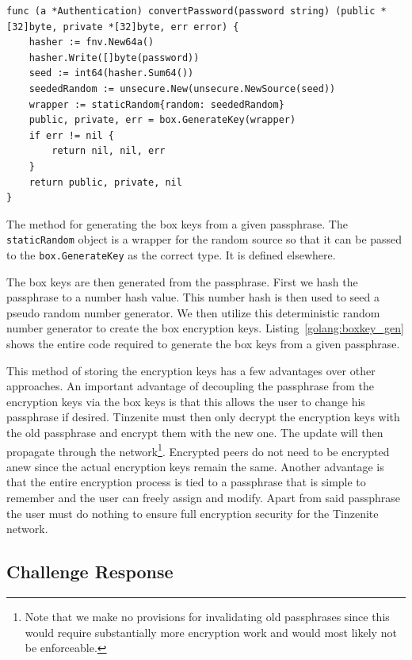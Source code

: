 \begin{listing}[htp]
    \begin{lstlisting}[language=golang,firstnumber=0]
func (a *Authentication) convertPassword(password string) (public *[32]byte, private *[32]byte, err error) {
	hasher := fnv.New64a()
	hasher.Write([]byte(password))
	seed := int64(hasher.Sum64())
	seededRandom := unsecure.New(unsecure.NewSource(seed))
	wrapper := staticRandom{random: seededRandom}
	public, private, err = box.GenerateKey(wrapper)
	if err != nil {
		return nil, nil, err
	}
	return public, private, nil
}
    \end{lstlisting}
\caption[Golang Box Key Generation]{The method for generating the box keys from a given passphrase. The \texttt{staticRandom} object is a wrapper for the random source so that it can be passed to the \texttt{box.GenerateKey} as the correct type. It is defined elsewhere.}
\label{golang:boxkey_gen}
\end{listing}

The box keys are then generated from the passphrase.
First we hash the passphrase to a number hash value.
This number hash is then used to seed a pseudo random number generator.
We then utilize this deterministic random number generator to create the box encryption keys.
Listing~\ref{golang:boxkey_gen} shows the entire code required to generate the box keys from a given passphrase.

This method of storing the encryption keys has a few advantages over other approaches.
An important advantage of decoupling the passphrase from the encryption keys via the box keys is that this allows the user to change his passphrase if desired.
Tinzenite must then only decrypt the encryption keys with the old passphrase and encrypt them with the new one.
The update will then propagate through the network\footnote{Note that we make no provisions for invalidating old passphrases since this would require substantially more encryption work and would most likely not be enforceable.}.
Encrypted peers do not need to be encrypted anew since the actual encryption keys remain the same.
Another advantage is that the entire encryption process is tied to a passphrase that is simple to remember and the user can freely assign and modify.
Apart from said passphrase the user must do nothing to ensure full encryption security for the Tinzenite network.

\subsection{Challenge Response}
\label{sub:Challenge Response}

